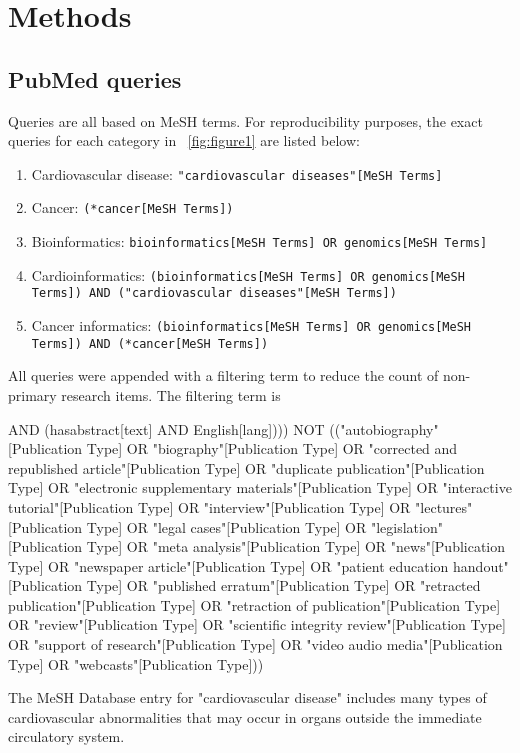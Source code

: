 \documentclass[letter]{bib}
\begin{document}
\section*{Methods}
\begin{methods}
    \subsection*{PubMed queries}
    Queries are all based on MeSH terms. For reproducibility purposes, the exact queries for each category in \figurename~\ref{fig:figure1} are listed below:
    \begin{enumerate}
    	\item Cardiovascular disease: \texttt{"cardiovascular diseases"[MeSH Terms]}
    	\item Cancer: \texttt{(*cancer[MeSH Terms])}
    	\item Bioinformatics: \texttt{bioinformatics[MeSH Terms] OR genomics[MeSH Terms]}
    	\item Cardioinformatics: \texttt{(bioinformatics[MeSH Terms] OR genomics[MeSH Terms]) AND ("cardiovascular diseases"[MeSH Terms])}
    	\item Cancer informatics: \texttt{(bioinformatics[MeSH Terms] OR genomics[MeSH Terms]) AND (*cancer[MeSH Terms])}
    \end{enumerate}
	
	All queries were appended with a filtering term to reduce the count of non-primary research items. The filtering term is
	
	{
	AND (hasabstract[text] AND English[lang]))) NOT (("autobiography"[Publication Type] OR "biography"[Publication Type] OR "corrected and republished article"[Publication Type] OR "duplicate publication"[Publication Type] OR "electronic supplementary materials"[Publication Type] OR "interactive tutorial"[Publication Type] OR "interview"[Publication Type] OR "lectures"[Publication Type] OR "legal cases"[Publication Type] OR "legislation"[Publication Type] OR "meta analysis"[Publication Type] OR "news"[Publication Type] OR "newspaper article"[Publication Type] OR "patient education handout"[Publication Type] OR "published erratum"[Publication Type] OR "retracted publication"[Publication Type] OR "retraction of publication"[Publication Type] OR "review"[Publication Type] OR "scientific integrity review"[Publication Type] OR "support of research"[Publication Type] OR "video audio media"[Publication Type] OR "webcasts"[Publication Type]))
}

    The MeSH Database entry for "cardiovascular disease" includes many types of cardiovascular abnormalities that may occur in organs outside the immediate circulatory system.
    

\end{methods}
\end{document}
